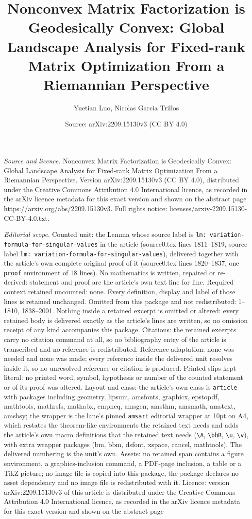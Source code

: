 \documentclass[10pt,a4paper]{amsart}
\title[Nonconvex Matrix Factorization is Geodesically Convex: Globa]{Nonconvex Matrix Factorization is Geodesically Convex: Global Landscape Analysis for Fixed-rank Matrix Optimization From a Riemannian Perspective}
\author{Yuetian Luo, Nicolas Garcia Trillos}
\date{Source: arXiv:2209.15130v3 (CC BY 4.0)}
\begin{document}
\maketitle

\noindent\emph{Source and licence.} Nonconvex Matrix Factorization is Geodesically Convex: Global Landscape Analysis for Fixed-rank Matrix Optimization From a Riemannian Perspective. Version arXiv:2209.15130v3 (CC BY 4.0), distributed under the Creative Commons Attribution 4.0 International licence, as recorded in the arXiv licence metadata for this exact version and shown on the abstract page https://arxiv.org/abs/2209.15130v3. Full rights notice: licenses/arxiv-2209.15130-CC-BY-4.0.txt.\par\smallskip

\noindent\textit{Editorial scope.} Counted unit: the Lemma whose source label is \texttt{lm: variation-formula-for-singular-values} in the article (source0.tex lines 1811--1819, source label \texttt{lm: variation-formula-for-singular-values}), delivered together with the article's own complete original proof of it (source0.tex lines 1820--1837, one \texttt{proof} environment of 18 lines). No mathematics is written, repaired or re-derived: statement and proof are the article's own text line for line. Required context retained uncounted: none. Every definition, display and label of those lines is retained unchanged. Omitted from this package and not redistributed: 1--1810, 1838--2001. Nothing inside a retained excerpt is omitted or altered: every retained body is delivered exactly as the article's lines are written, so no omission receipt of any kind accompanies this package. Citations: the retained excerpts carry no citation command at all, so no bibliography entry of the article is transcribed and no reference is redistributed. Reference adaptation: none was needed and none was made; every reference inside the delivered unit resolves inside it, so no unresolved reference or citation is produced. Printed slips kept literal: no printed word, symbol, hypothesis or number of the counted statement or of its proof was altered. Layout and class: the article's own class is \texttt{article} with packages including geometry, lipsum, amsfonts, graphicx, epstopdf, mathtools, mathrsfs, mathabx, empheq, amsgen, amsthm, amsmath, amstext, amsbsy; the wrapper is the lane's pinned \texttt{amsart} editorial wrapper at 10pt on A4, which restates the theorem-like environments the retained text needs and adds the article's own macro definitions that the retained text needs (\texttt{\textbackslash A}, \texttt{\textbackslash bbR}, \texttt{\textbackslash u}, \texttt{\textbackslash v}), with extra wrapper packages (bm, bbm, dsfont, xspace, cancel, mathtools). The delivered numbering is the unit's own. Assets: no retained span contains a figure environment, a graphics-inclusion command, a PDF-page inclusion, a table or a TikZ picture; no image file is copied into this package, the package declares no asset dependency and no image file is redistributed with it. Licence: version arXiv:2209.15130v3 of this article is distributed under the Creative Commons Attribution 4.0 International licence, as recorded in the arXiv licence metadata for this exact version and shown on the abstract page 
\end{document}
